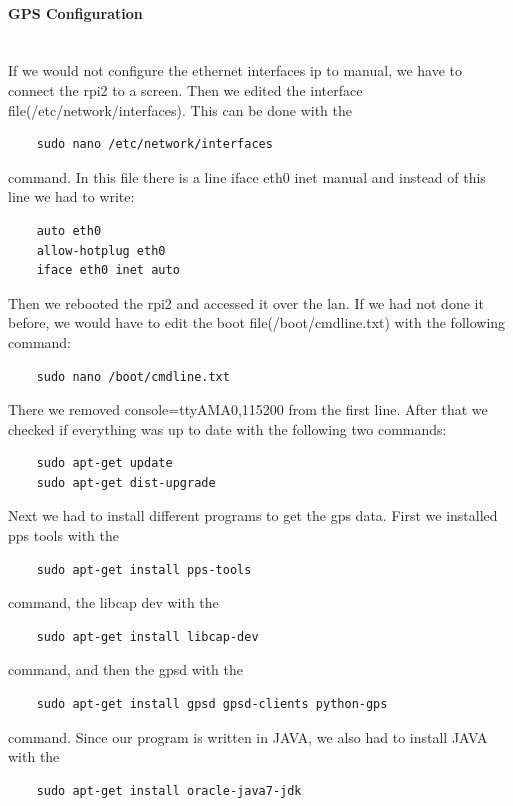 \paragraph{GPS Configuration} \mbox{}\\
If we would not configure the ethernet interfaces \gls{ip} to manual, we have to connect the \gls{rpi2} to a screen. Then we edited the interface file(/etc/network/interfaces). This can be done with the 
\begin{verbatim}
	sudo nano /etc/network/interfaces
\end{verbatim}
command. \newline
In this file there is a line iface eth0 inet manual and instead of this line we had to write:
\begin{verbatim}
	auto eth0
	allow-hotplug eth0
	iface eth0 inet auto
\end{verbatim}
Then we rebooted the \gls{rpi2} and accessed it over the \gls{lan}. \newline
If we had not done it before, we would have to edit the boot file(/boot/cmdline.txt) with the following command:
\begin{verbatim}
	sudo nano /boot/cmdline.txt
\end{verbatim}
There we removed console=ttyAMA0,115200 from the first line.\newline
After that we checked if everything was up to date with the following two commands:
\begin{verbatim}
	sudo apt-get update
	sudo apt-get dist-upgrade
\end{verbatim}
Next we had to install different programs to get the \gls{gps} data.\newline
First we installed pps tools with the 
\begin{verbatim}
	sudo apt-get install pps-tools
\end{verbatim}
command, the libcap dev with the 
\begin{verbatim}
	sudo apt-get install libcap-dev
\end{verbatim}
command, and then the \gls{gpsd} with the 
\begin{verbatim}
	sudo apt-get install gpsd gpsd-clients python-gps
\end{verbatim}
command.\newline
Since our program is written in JAVA, we also had to install JAVA with the 
\begin{verbatim}
	sudo apt-get install oracle-java7-jdk
\end{verbatim}
